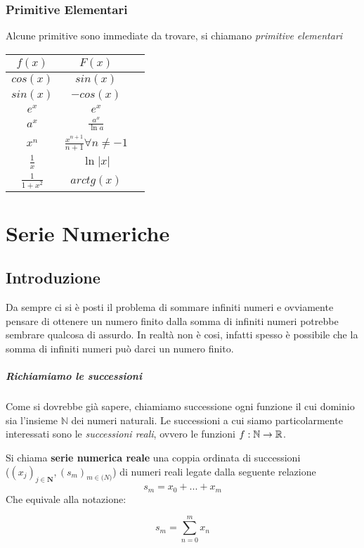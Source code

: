\documentclass[12pt, a4paper, openany]{book}
\newcommand{\definizione}[1]{\begin{box_definizione} #1 \end{box_definizione}}
\begin{document}
\subsection{Primitive Elementari}
Alcune primitive sono immediate da trovare, si chiamano \emph{primitive elementari}\\
\begin{tabular}{ |c|c|c| } 
    \hline
    $f(x)$ & $F(x)$ \\
    \hline
    $cos(x)$ & $sin(x)$ \\
    \hline
    $sin(x)$ & $-cos(x)$ \\
    \hline
    $e^x$ & $e^x$ \\
    \hline
    $a^x$ & $\frac{a^x}{\ln a} $ \\
    \hline
    $x^n$ & $\frac{x^{n+1}}{n+1} \forall n\neq -1 $ \\
    \hline
    $\frac{1}{x}$ & $\ln |x| $ \\
    \hline
    $\frac{1}{1+x^2}$ & $arctg(x) $ \\
    \hline
\end{tabular}


\chapter{Serie Numeriche}
\section{Introduzione}
Da sempre ci si è posti il problema di sommare infiniti numeri e ovviamente pensare di ottenere un numero finito dalla somma di infiniti numeri potrebbe sembrare qualcosa di assurdo.
In realtà non è cosi, infatti spesso è possibile che la somma di infiniti numeri può darci un numero finito.

\paragraph*{Richiamiamo le successioni}
Come si dovrebbe già sapere, chiamiamo successione ogni funzione il cui dominio sia l'insieme $\mathbb{N}$ dei numeri naturali.
Le successioni a cui siamo particolarmente interessati sono le \emph{successioni reali}, ovvero le funzioni $f : \mathbb{N} \rightarrow \mathbb{R}$.
\definizione{
Si chiama \textbf{serie numerica reale} una coppia ordinata di successioni \\
($(x_j)_{j\in \mathbf{N}}, (s_m)_{m\in \mathbf(N)}$) di numeri reali legate dalla seguente relazione
\begin{equation*}
    s_m = x_0 + ... + x_m
\end{equation*}
Che equivale alla notazione:

\begin{equation*}
    s_m = \sum_{n=0}^m x_n
\end{equation*}
}
\end{document}
